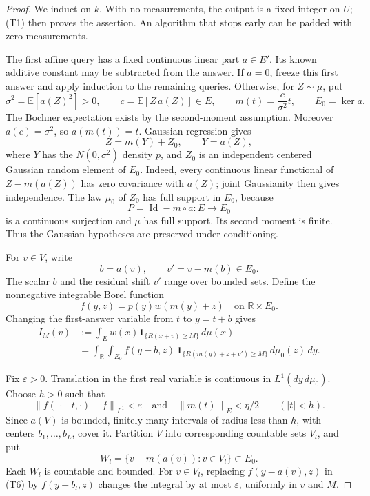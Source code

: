 \documentclass[11pt,a4paper]{article}
\newcommand{\R}{\mathbb R}
\newcommand{\E}{\mathbb E}
\newcommand{\norm}[1]{\left\lVert#1\right\rVert}
\newcommand{\abs}[1]{\left\lvert#1\right\rvert}
\theoremstyle{definition}
\theoremstyle{remark}
\numberwithin{equation}{section}
\begin{document}
\begin{proof}
We induct on \(k\). With no measurements, the output is a fixed integer
on \(U\); (T1) then proves the assertion. An algorithm that stops early
can be padded with zero measurements.

The first affine query has a fixed continuous linear part \(a\in E'\).
Its known additive constant may be subtracted from the answer. If
\(a=0\), freeze this first answer and apply induction to the remaining
queries. Otherwise, for \(Z\sim\mu\), put
\[
 \sigma^2=\E[a(Z)^2]>0,\qquad
 c=\E[Z\,a(Z)]\in E,\qquad
 m(t)=\frac{c}{\sigma^2}t,\qquad E_0=\ker a .
 \tag{T3}
\]
The Bochner expectation exists by the second-moment assumption.
Moreover \(a(c)=\sigma^2\), so \(a(m(t))=t\). Gaussian regression gives
\[
              Z=m(Y)+Z_0,\qquad Y=a(Z),
 \tag{T4}
\]
where \(Y\) has the \(N(0,\sigma^2)\) density \(p\), and \(Z_0\) is an
independent centered Gaussian random element of \(E_0\).
Indeed, every continuous linear functional of
\(Z-m(a(Z))\) has zero covariance with \(a(Z)\); joint Gaussianity
then gives independence. The law \(\mu_0\) of \(Z_0\) has full support
in \(E_0\), because
\[
                   P=\operatorname{Id}-m\circ a:E\to E_0
\]
is a continuous surjection and \(\mu\) has full support.
Its second moment is finite. Thus the Gaussian hypotheses are preserved
under conditioning.

For \(v\in V\), write
\[
                  b=a(v),\qquad v'=v-m(b)\in E_0.
 \tag{T5}
\]
The scalar \(b\) and the residual shift \(v'\) range over bounded sets.
Define the nonnegative integrable Borel function
\[
                  f(y,z)=p(y)w(m(y)+z)
       \quad\text{on }\R\times E_0.
\]
Changing the first-answer variable from \(t\) to \(y=t+b\) gives
\[
\begin{split}
 I_M(v)&:=\int_Ew(x)\mathbf1_{\{R(x+v)\ge M\}}\,d\mu(x)\\
 &=\int_{\R}\int_{E_0}
       f(y-b,z)\,
       \mathbf1_{\{R(m(y)+z+v')\ge M\}}\,d\mu_0(z)\,dy.
\end{split}
 \tag{T6}
\]

Fix \(\varepsilon>0\). Translation in the first real variable is
continuous in \(L^1(dy\,d\mu_0)\). Choose \(h>0\) such that
\[
 \norm{f(\,\cdot-t,\cdot)-f}_{L^1}<\varepsilon
 \quad\text{and}\quad \norm{m(t)}_E<\eta/2
                   \qquad(\abs t<h).
 \tag{T7}
\]
Since \(a(V)\) is bounded, finitely many intervals of radius less than
\(h\), with centers \(b_1,\ldots,b_L\), cover it. Partition \(V\) into
corresponding countable sets \(V_l\), and put
\[
                 W_l=\{v-m(a(v)):v\in V_l\}\subset E_0 .
 \tag{T8}
\]
Each \(W_l\) is countable and bounded. For \(v\in V_l\), replacing
\(f(y-a(v),z)\) in (T6) by \(f(y-b_l,z)\) changes the integral by at
most \(\varepsilon\), uniformly in \(v\) and \(M\).


\end{proof}
\end{document}
